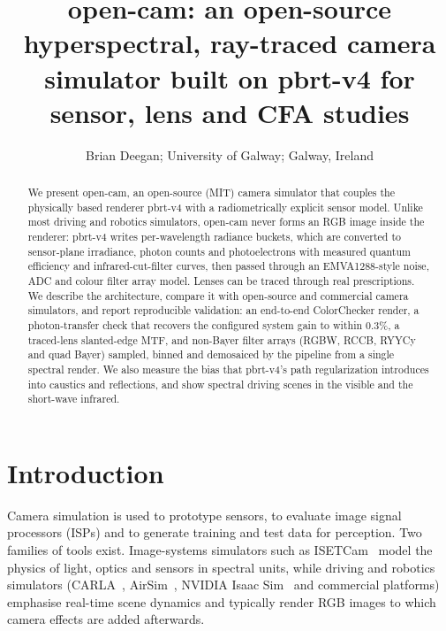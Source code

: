 \documentclass[letterpaper,twocolumn,fleqn]{article}
\title{open-cam: an open-source hyperspectral, ray-traced camera simulator built on pbrt-v4 for sensor, lens and CFA studies}
\author{Brian Deegan;
        University of Galway;
        Galway, Ireland}
\date{}
\begin{document}
\maketitle
\thispagestyle{empty}

\begin{abstract}
We present open-cam, an open-source (MIT) camera simulator that couples the physically based renderer pbrt-v4 with a radiometrically explicit sensor model. Unlike most driving and robotics simulators, open-cam never forms an RGB image inside the renderer: pbrt-v4 writes per-wavelength radiance buckets, which are converted to sensor-plane irradiance, photon counts and photoelectrons with measured quantum efficiency and infrared-cut-filter curves, then passed through an EMVA1288-style noise, ADC and colour filter array model. Lenses can be traced through real prescriptions. We describe the architecture, compare it with open-source and commercial camera simulators, and report reproducible validation: an end-to-end ColorChecker render, a photon-transfer check that recovers the configured system gain to within 0.3\%, a traced-lens slanted-edge MTF, and non-Bayer filter arrays (RGBW, RCCB, RYYCy and quad Bayer) sampled, binned and demosaiced by the pipeline from a single spectral render. We also measure the bias that pbrt-v4's path regularization introduces into caustics and reflections, and show spectral driving scenes in the visible and the short-wave infrared.
\end{abstract}

\section{Introduction}
Camera simulation is used to prototype sensors, to evaluate image signal processors (ISPs) and to generate training and test data for perception. Two families of tools exist. Image-systems simulators such as ISETCam~\cite{farrell2003simulation,farrell2012digital,isetcam} model the physics of light, optics and sensors in spectral units, while driving and robotics simulators (CARLA~\cite{dosovitskiy2017carla}, AirSim~\cite{shah2017airsim}, NVIDIA Isaac Sim~\cite{isaaccamera} and commercial platforms) emphasise real-time scene dynamics and typically render RGB images to which camera effects are added afterwards.
\end{document}
